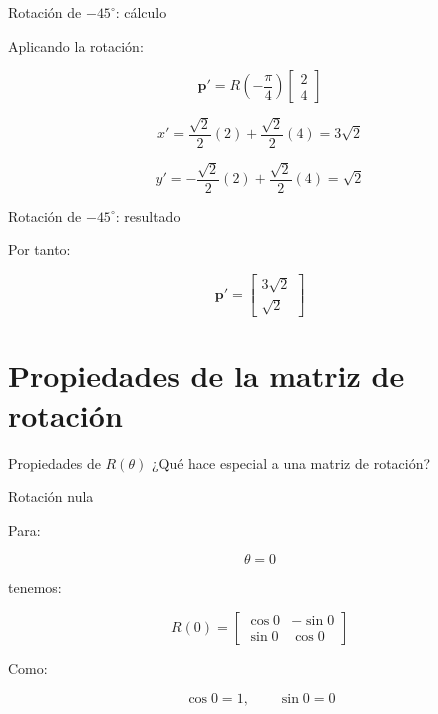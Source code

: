 \documentclass[aspectratio=169]{beamer}
\begin{document}
\begin{frame}{Rotación de \texorpdfstring{$-45^\circ$}{-45 grados}: cálculo}

    Aplicando la rotación:

    \[
    \mathbf{p}'
    =
    R\left(-\frac{\pi}{4}\right)
    \begin{bmatrix}
        2\\
        4
    \end{bmatrix}
    \]

    \[
    x'
    =
    \frac{\sqrt{2}}{2}(2)
    +
    \frac{\sqrt{2}}{2}(4)
    =
    3\sqrt{2}
    \]

    \[
    y'
    =
    -\frac{\sqrt{2}}{2}(2)
    +
    \frac{\sqrt{2}}{2}(4)
    =
    \sqrt{2}
    \]

\end{frame}

\begin{frame}{Rotación de \texorpdfstring{$-45^\circ$}{-45 grados}: resultado}

    Por tanto:

    \[
    \boxed{
        \mathbf{p}'
        =
        \begin{bmatrix}
            3\sqrt{2}\\
            \sqrt{2}
    \end{bmatrix}}
    \]

    \vspace{0.4cm}


\end{frame}

\section{Propiedades de la matriz de rotación}

\SectionSlide
{Propiedades de $R(\theta)$}
{¿Qué hace especial a una matriz de rotación?}

\begin{frame}{Rotación nula}

    Para:

    \[
    \theta=0
    \]

    tenemos:

    \[
    R(0)
    =
    \begin{bmatrix}
        \cos0 & -\sin0\\
        \sin0 & \cos0
    \end{bmatrix}
    \]

    Como:

    \[
    \cos0=1,
    \qquad
    \sin0=0
    \]

\end{frame}
\end{document}

